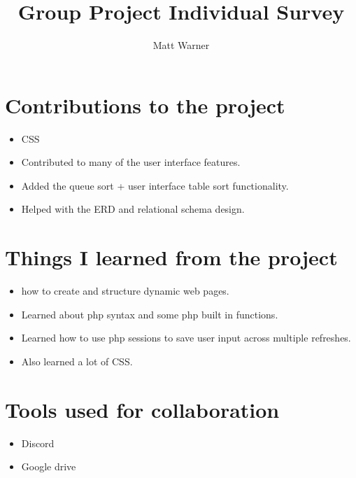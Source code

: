 \documentclass{report}
\title{\Huge\textbf{Group Project Individual Survey}}
\author{
    \Large Matt Warner
}
\date{\huge{}}
\begin{document}
    \maketitle
\section{Contributions to the project}
\begin{itemize}
    \item CSS
    \item Contributed to many of the user interface features.
    \item Added the queue sort + user interface table sort functionality.
    \item Helped with the ERD and relational schema design.
\end{itemize}
\section{Things I learned from the project}
\begin{itemize}
    \item how to create and structure dynamic web pages.
    \item Learned about php syntax and some php built in functions.
    \item Learned how to use php sessions to save user input across multiple refreshes.
    \item Also learned a lot of CSS.
\end{itemize}
\section{Tools used for collaboration}
\begin{itemize}
\item Discord
\item Google drive
\end{itemize}
\end{document}

